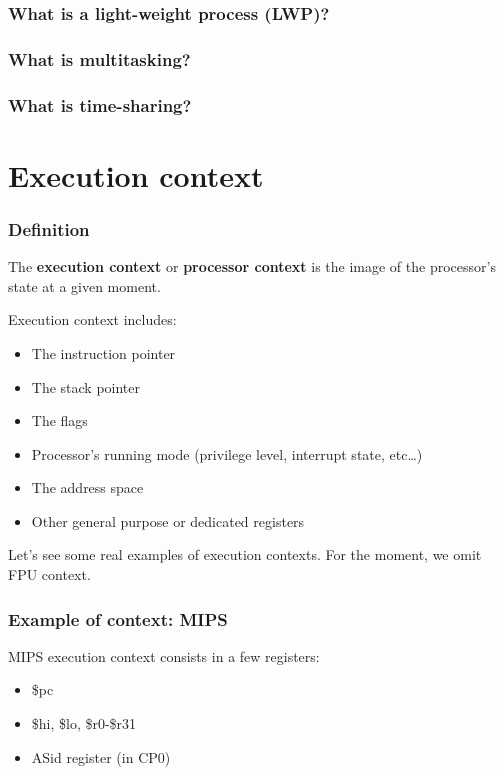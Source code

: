 
\begin{frame}
  \frametitle{What is a light-weight process (LWP)?}

\end{frame}


\begin{frame}
  \frametitle{What is multitasking?}

\end{frame}


\begin{frame}
  \frametitle{What is time-sharing?}

\end{frame}

%
%

\section{Execution context}


\begin{frame}
  \frametitle{Definition}

  The \textbf{execution context} or \textbf{processor context} is the
  image of the processor's state at a given moment.

  Execution context includes:

  \begin{itemize}
  \item
    The instruction pointer
  \item
    The stack pointer
  \item
    The flags
  \item
    Processor's running mode (privilege level, interrupt state,
    etc\ldots)
  \item
    The address space
  \item
    Other general purpose or dedicated registers
  \end{itemize}

  \-

  Let's see some real examples of execution contexts. For the moment,
  we omit FPU context.

\end{frame}


\begin{frame}
  \frametitle{Example of context: MIPS}

  MIPS execution context consists in a few registers:

  \begin{itemize}
  \item
    \$pc
  \item
    \$hi, \$lo, \$r0-\$r31
  \item
    ASid register (in CP0)
  \end{itemize}

\end{frame}

